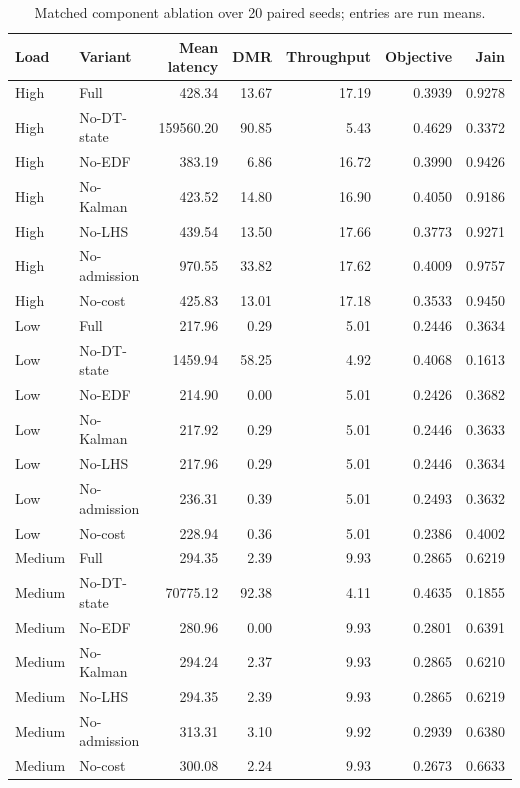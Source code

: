 \begin{table}[t]
\centering
\caption{Matched component ablation over 20 paired seeds; entries are run means.}
\label{tab:independent_ablation}
\scriptsize
\begin{tabular}{llrrrrr}
\toprule
Load & Variant & Mean latency & DMR & Throughput & Objective & Jain \\
\midrule
High & Full & 428.34 & 13.67 & 17.19 & 0.3939 & 0.9278 \\
High & No-DT-state & 159560.20 & 90.85 & 5.43 & 0.4629 & 0.3372 \\
High & No-EDF & 383.19 & 6.86 & 16.72 & 0.3990 & 0.9426 \\
High & No-Kalman & 423.52 & 14.80 & 16.90 & 0.4050 & 0.9186 \\
High & No-LHS & 439.54 & 13.50 & 17.66 & 0.3773 & 0.9271 \\
High & No-admission & 970.55 & 33.82 & 17.62 & 0.4009 & 0.9757 \\
High & No-cost & 425.83 & 13.01 & 17.18 & 0.3533 & 0.9450 \\
Low & Full & 217.96 & 0.29 & 5.01 & 0.2446 & 0.3634 \\
Low & No-DT-state & 1459.94 & 58.25 & 4.92 & 0.4068 & 0.1613 \\
Low & No-EDF & 214.90 & 0.00 & 5.01 & 0.2426 & 0.3682 \\
Low & No-Kalman & 217.92 & 0.29 & 5.01 & 0.2446 & 0.3633 \\
Low & No-LHS & 217.96 & 0.29 & 5.01 & 0.2446 & 0.3634 \\
Low & No-admission & 236.31 & 0.39 & 5.01 & 0.2493 & 0.3632 \\
Low & No-cost & 228.94 & 0.36 & 5.01 & 0.2386 & 0.4002 \\
Medium & Full & 294.35 & 2.39 & 9.93 & 0.2865 & 0.6219 \\
Medium & No-DT-state & 70775.12 & 92.38 & 4.11 & 0.4635 & 0.1855 \\
Medium & No-EDF & 280.96 & 0.00 & 9.93 & 0.2801 & 0.6391 \\
Medium & No-Kalman & 294.24 & 2.37 & 9.93 & 0.2865 & 0.6210 \\
Medium & No-LHS & 294.35 & 2.39 & 9.93 & 0.2865 & 0.6219 \\
Medium & No-admission & 313.31 & 3.10 & 9.92 & 0.2939 & 0.6380 \\
Medium & No-cost & 300.08 & 2.24 & 9.93 & 0.2673 & 0.6633 \\
\bottomrule
\end{tabular}
\end{table}


